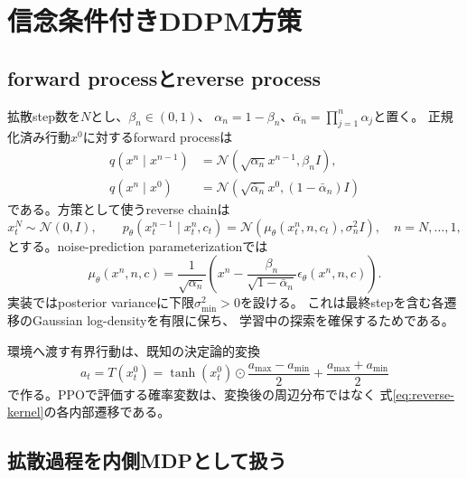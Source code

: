 \documentclass[a4paper,11pt]{article}
\newcommand{\Normal}{\mathcal{N}}
\begin{document}
\section{信念条件付きDDPM方策}

\subsection{forward processとreverse process}

拡散step数を$N$とし、$\beta_n\in(0,1)$、
$\alpha_n=1-\beta_n$、$\bar\alpha_n=\prod_{j=1}^{n}\alpha_j$と置く。
正規化済み行動$x^0$に対するforward processは
\begin{align}
  q(x^n\mid x^{n-1})
    &=\Normal\!\left(\sqrt{\alpha_n}x^{n-1},\beta_n I\right),\\
  q(x^n\mid x^0)
    &=\Normal\!\left(\sqrt{\bar\alpha_n}x^0,
      (1-\bar\alpha_n)I\right)
  \label{eq:forward-ddpm}
\end{align}
である。方策として使うreverse chainは
\begin{equation}
  x_t^N\sim\Normal(0,I),\qquad
  p_\theta(x_t^{n-1}\mid x_t^n,c_t)
  =\Normal\!\left(\mu_\theta(x_t^n,n,c_t),\sigma_n^2 I\right),
  \quad n=N,\ldots,1,
  \label{eq:reverse-kernel}
\end{equation}
とする。noise-prediction parameterizationでは
\begin{equation}
  \mu_\theta(x^n,n,c)
  =\frac{1}{\sqrt{\alpha_n}}
    \left(
      x^n-\frac{\beta_n}{\sqrt{1-\bar\alpha_n}}
      \epsilon_\theta(x^n,n,c)
    \right).
  \label{eq:ddpm-mean}
\end{equation}
実装ではposterior varianceに下限$\sigma_{\min}^2>0$を設ける。
これは最終stepを含む各遷移のGaussian log-densityを有限に保ち、
学習中の探索を確保するためである。

環境へ渡す有界行動は、既知の決定論的変換
\begin{equation}
  a_t=T(x_t^0)
  =\tanh(x_t^0)\odot\frac{a_{\max}-a_{\min}}{2}
   +\frac{a_{\max}+a_{\min}}{2}
  \label{eq:action-transform}
\end{equation}
で作る。PPOで評価する確率変数は、変換後の周辺分布ではなく
式\eqref{eq:reverse-kernel}の各内部遷移である。

\subsection{拡散過程を内側MDPとして扱う}
\end{document}
